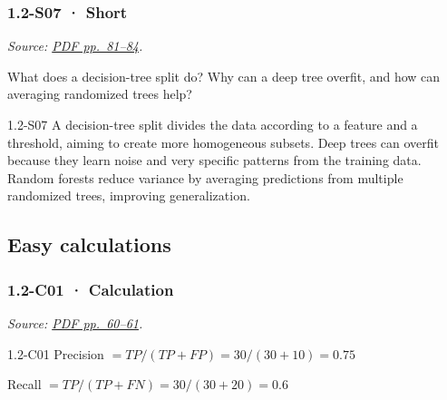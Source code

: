\noindent\begin{minipage}{\linewidth}

\subsubsection{1.2-S07 · Short}\label{s07-short-1}

\emph{Source:
\href{../Lecture\%20Slides/1.2.\%20Shallow\%20Learning.pdf\#page=81}{PDF
pp.~81--84}.}

What does a decision-tree split do? Why can a deep tree overfit, and how
can averaging randomized trees help?

\begin{solution}[20mm]{1.2-S07}
A decision-tree split divides the data according to a feature and a threshold, aiming to create more homogeneous subsets. Deep trees can overfit because they learn noise and very specific patterns from the training data. Random forests reduce variance by averaging predictions from multiple randomized trees, improving generalization.
\end{solution}
\end{minipage}\par\medskip

\subsection{Easy calculations}\label{easy-calculations-1}

\noindent\begin{minipage}{\linewidth}

\subsubsection{1.2-C01 · Calculation}\label{c01-calculation-1}

\emph{Source:
\href{../Lecture\%20Slides/1.2.\%20Shallow\%20Learning.pdf\#page=60}{PDF
pp.~60--61}.}

\begin{solution}[26mm]{1.2-C01}
Precision $= TP / (TP + FP) = 30 / (30 + 10) = 0.75$

Recall $= TP / (TP + FN) = 30 / (30 + 20) = 0.6$
\end{solution}
\end{minipage}\par\medskip

